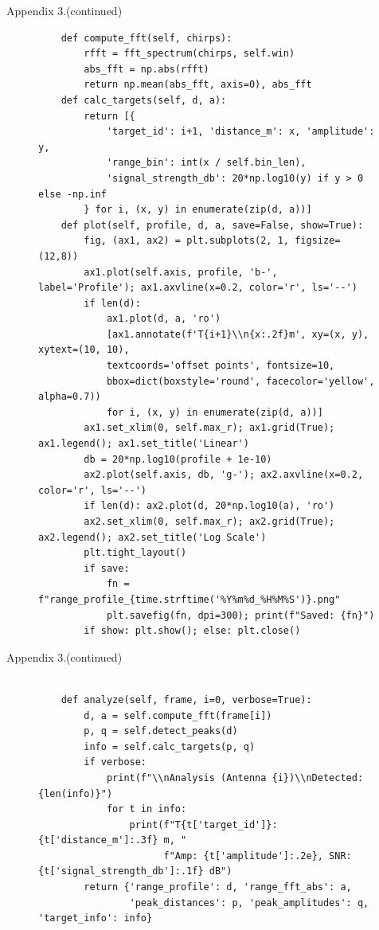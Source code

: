 \newpage
\hfill \large Appendix 3.(continued)

\begin{figure}[H]
\centering
\begin{verbatim}
    def compute_fft(self, chirps):
        rfft = fft_spectrum(chirps, self.win)
        abs_fft = np.abs(rfft)
        return np.mean(abs_fft, axis=0), abs_fft
    def calc_targets(self, d, a):
        return [{
            'target_id': i+1, 'distance_m': x, 'amplitude': y,
            'range_bin': int(x / self.bin_len),
            'signal_strength_db': 20*np.log10(y) if y > 0 else -np.inf
        } for i, (x, y) in enumerate(zip(d, a))]
    def plot(self, profile, d, a, save=False, show=True):
        fig, (ax1, ax2) = plt.subplots(2, 1, figsize=(12,8))
        ax1.plot(self.axis, profile, 'b-', label='Profile'); ax1.axvline(x=0.2, color='r', ls='--')
        if len(d):
            ax1.plot(d, a, 'ro')
            [ax1.annotate(f'T{i+1}\\n{x:.2f}m', xy=(x, y), xytext=(10, 10),
            textcoords='offset points', fontsize=10,
            bbox=dict(boxstyle='round', facecolor='yellow', alpha=0.7))
            for i, (x, y) in enumerate(zip(d, a))]
        ax1.set_xlim(0, self.max_r); ax1.grid(True); ax1.legend(); ax1.set_title('Linear')
        db = 20*np.log10(profile + 1e-10)
        ax2.plot(self.axis, db, 'g-'); ax2.axvline(x=0.2, color='r', ls='--')
        if len(d): ax2.plot(d, 20*np.log10(a), 'ro')
        ax2.set_xlim(0, self.max_r); ax2.grid(True); ax2.legend(); ax2.set_title('Log Scale')
        plt.tight_layout()
        if save:
            fn = f"range_profile_{time.strftime('%Y%m%d_%H%M%S')}.png"
            plt.savefig(fn, dpi=300); print(f"Saved: {fn}")
        if show: plt.show(); else: plt.close()
\end{verbatim}
\end{figure}

\newpage
\hfill \large Appendix 3.(continued)

\begin{figure}[H]
\centering
\begin{verbatim}

    def analyze(self, frame, i=0, verbose=True):
        d, a = self.compute_fft(frame[i])
        p, q = self.detect_peaks(d)
        info = self.calc_targets(p, q)
        if verbose:
            print(f"\\nAnalysis (Antenna {i})\\nDetected: {len(info)}")
            for t in info:
                print(f"T{t['target_id']}: {t['distance_m']:.3f} m, "
                      f"Amp: {t['amplitude']:.2e}, SNR: {t['signal_strength_db']:.1f} dB")
        return {'range_profile': d, 'range_fft_abs': a,
                'peak_distances': p, 'peak_amplitudes': q, 'target_info': info}
\end{verbatim}
\end{figure}


